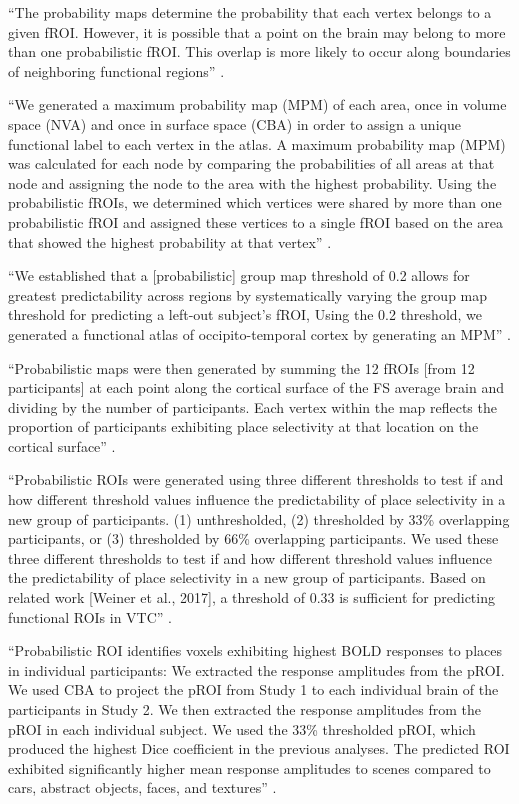 ``The probability maps determine the probability that each vertex belongs to a
given fROI.
%
However, it is possible that a point on the brain may belong to more than one
probabilistic fROI.
%
This overlap is more likely to occur along boundaries of neighboring functional
regions'' \citep{rosenke2021probabilistic}.

``We generated a maximum probability map (MPM) of each area, once in volume
space (NVA) and once in surface space (CBA) in order to assign a unique
functional label to each vertex in the atlas.
%
A maximum probability map (MPM) was calculated for each node by comparing the
probabilities of all areas at that node and assigning the node to the area with
the highest probability.
%
Using the probabilistic fROIs, we determined which vertices were shared by more
than one probabilistic fROI and assigned these vertices to a single fROI based
on the area that showed the highest probability at that vertex''
\citep{rosenke2021probabilistic}.

``We established that a [probabilistic] group map threshold of 0.2 allows for
greatest predictability across regions by systematically varying the group map
threshold for predicting a left-out subject's fROI,
%
Using the 0.2 threshold, we generated a functional atlas of occipito-temporal
cortex by generating an MPM'' \citep{rosenke2021probabilistic}.



``Probabilistic maps were then generated by summing the 12 fROIs [from 12
participants] at each point along the cortical surface of the FS average brain
and dividing by the number of participants.
%
Each vertex within the map reflects the proportion of participants exhibiting
place selectivity at that location on the cortical surface''
\citep{weiner2018defining}.

``Probabilistic ROIs were generated using three different thresholds to test if
and how different threshold values influence the predictability of place
selectivity in a new group of participants.
%
(1) unthresholded,
%
(2) thresholded by 33\% overlapping participants, or
%
(3) thresholded by 66\% overlapping participants.
%
We used these three different thresholds to test if and how different threshold
values influence the predictability of place selectivity in a new group of
participants. Based on related work [Weiner et al., 2017], a threshold of 0.33
is sufficient for predicting functional ROIs in VTC''
\citep{weiner2018defining}.

``Probabilistic ROI identifies voxels exhibiting highest BOLD responses to
places in individual participants:
%
We extracted the response amplitudes from the pROI.
%
We used CBA to project the pROI from Study 1 to each individual brain of the
participants in Study 2.
%
We then extracted the response amplitudes from the pROI in each individual
subject.
%
We used the 33\% thresholded pROI, which produced the highest Dice coefficient
in the previous analyses.
%
The predicted ROI exhibited significantly higher mean response amplitudes to
scenes compared to cars, abstract objects, faces, and textures''
\citep{weiner2018defining}.




